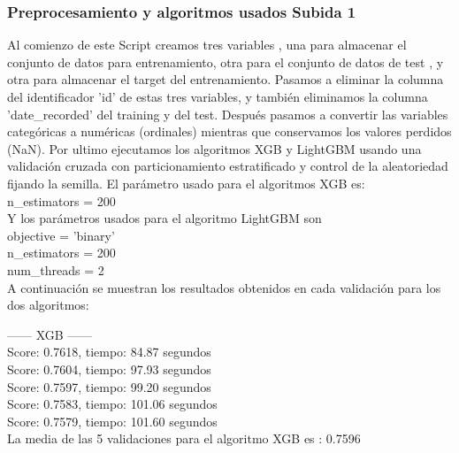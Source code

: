 	
	
	\subsubsection[Preprocesamiento y algoritmos usados Subida 1]{Preprocesamiento y algoritmos usados Subida 1}
	
	Al comienzo de este Script creamos tres variables , una para almacenar el conjunto de datos para entrenamiento, otra para el conjunto de datos de test , y otra para almacenar el target del entrenamiento. Pasamos a eliminar la columna del identificador 'id' de estas tres variables, y también eliminamos la columna 'date\_recorded' del training y del test. Después pasamos a convertir las variables categóricas a numéricas (ordinales) mientras que conservamos los valores perdidos (NaN). Por ultimo ejecutamos los algoritmos XGB y LightGBM usando una validación cruzada con particionamiento estratificado y control de la aleatoriedad fijando la semilla. El parámetro usado para el algoritmos XGB es:\\
	
	n\_estimators = 200 \\
	
	Y los parámetros usados para el algoritmo LightGBM son\\
	
	objective = 'binary'\\
	n\_estimators = 200\\
	num\_threads = 2\\
	
	A continuación se muestran los resultados obtenidos en cada validación para los dos algoritmos:
	
	------ XGB ------ 			   		   \\
	Score: 0.7618, tiempo:  84.87 segundos \\
	Score: 0.7604, tiempo:  97.93 segundos \\
	Score: 0.7597, tiempo:  99.20 segundos \\
	Score: 0.7583, tiempo: 101.06 segundos \\
	Score: 0.7579, tiempo: 101.60 segundos \\
	
	La media de las 5 validaciones para el algoritmo XGB es : 0.7596 \\
	
